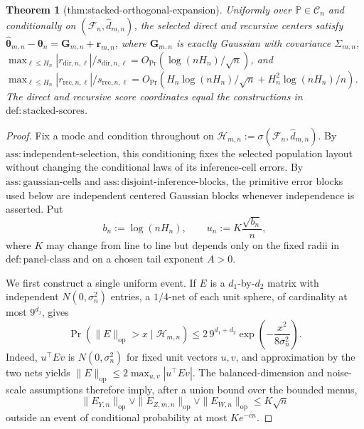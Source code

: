 \documentclass{article}
\newtheorem{theorem}{Theorem}
\begin{document}
\begin{theorem}[thm:stacked-orthogonal-expansion]\label{thm:stacked-orthogonal-expansion}
Uniformly over \(\mathbb P\in\mathcal C_n\) and conditionally on \((\mathcal F_n,\widehat d_{m,n})\), the selected direct and recursive centers satisfy \(\widehat{\boldsymbol\theta}_{m,n}-\boldsymbol\theta_n=\boldsymbol G_{m,n}+\boldsymbol r_{m,n}\), where \(\boldsymbol G_{m,n}\) is exactly Gaussian with covariance \(\Sigma_{m,n}\), \(\max_{\ell\le H_n}|r_{\mathrm{dir},n,\ell}|/s_{\mathrm{dir},n,\ell}=O_{\Pr}(\log(nH_n)/\sqrt n)\), and \(\max_{\ell\le H_n}|r_{\mathrm{rec},n,\ell}|/s_{\mathrm{rec},n,\ell}=O_{\Pr}(H_n\log(nH_n)/\sqrt n+H_n^2\log(nH_n)/n)\). The direct and recursive score coordinates equal the constructions in \(\mathrm{def{:}stacked\mbox{-}scores}\).
\end{theorem}
\begin{proof}
Fix a mode and condition throughout on \(\mathcal H_{m,n}:=\sigma(\mathcal F_n,\widehat d_{m,n})\).  By \(\mathrm{ass{:}independent\mbox{-}selection}\), this conditioning fixes the selected population layout without changing the conditional laws of its inference-cell errors.  By \(\mathrm{ass{:}gaussian\mbox{-}cells}\) and \(\mathrm{ass{:}disjoint\mbox{-}inference\mbox{-}blocks}\), the primitive error blocks used below are independent centered Gaussian blocks whenever independence is asserted.  Put
\[
 b_n:=\log(nH_n),\qquad u_n:=K\frac{\sqrt{b_n}}{n},
\]
where \(K\) may change from line to line but depends only on the fixed radii in \(\mathrm{def{:}panel\mbox{-}class}\) and on a chosen tail exponent \(A>0\).

We first construct a single uniform event.  If \(E\) is a \(d_1\)-by-\(d_2\) matrix with independent \(N(0,\sigma_n^2)\) entries, a \(1/4\)-net of each unit sphere, of cardinality at most \(9^{d_j}\), gives
\[
 \Pr\!\left(\|E\|_{\mathrm{op}}>x\mid\mathcal H_{m,n}\right)
 \le 2\,9^{d_1+d_2}
       \exp\!\left(-\frac{x^2}{8\sigma_n^2}\right).
 \tag{1}
\]
Indeed, \(u^{\top}Ev\) is \(N(0,\sigma_n^2)\) for fixed unit vectors \(u,v\), and approximation by the two nets yields \(\|E\|_{\mathrm{op}}\le2\max_{u,v}|u^{\top}Ev|\).  The balanced-dimension and noise-scale assumptions therefore imply, after a union bound over the bounded menus,
\[
 \|E_{Y,n}\|_{\mathrm{op}}\vee\|E_{Z,m,n}\|_{\mathrm{op}}
 \vee\|E_{W,n}\|_{\mathrm{op}}\le K\sqrt n
 \tag{2}
\]
outside an event of conditional probability at most \(K e^{-cn}\).


\end{proof}
\end{document}
